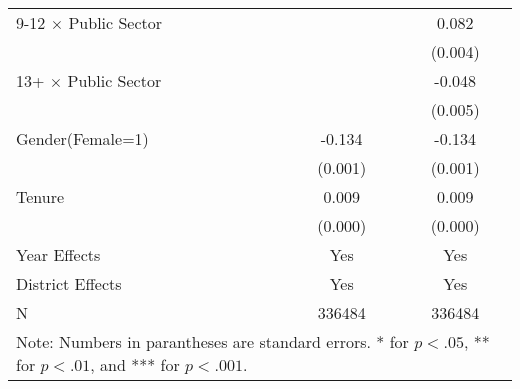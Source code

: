 \documentclass[12pt,author-year]{article}
\begin{document}
\begin{table}[H]
{{\begin{tabular}{l*{2}{c}}
				9-12 $\times$ Public Sector&                  &    0.082\sym{***}\\
				&                  &  (0.004)         \\
				
				13+ $\times$ Public Sector&                  &   -0.048\sym{***}\\
				&                  &  (0.005)         \\
				Gender(Female=1)     &   -0.134\sym{***}&   -0.134\sym{***}\\
				&  (0.001)         &  (0.001)         \\
				Tenure             &    0.009\sym{***}&    0.009\sym{***}\\
				&  (0.000)         &  (0.000)         \\
				\midrule
				Year Effects        &         Yes         &         Yes         \\
				District Effects        &         Yes         &         Yes         \\
				N                   &  336484         &  336484       \\
				\bottomrule
				\multicolumn{3}{l}{\footnotesize Note: Numbers in parantheses are standard errors. * for $p<.05$, ** for $p<.01$, and *** for $p<.001$.}\\
	\end{tabular}}}
\end{table}
\end{document}

